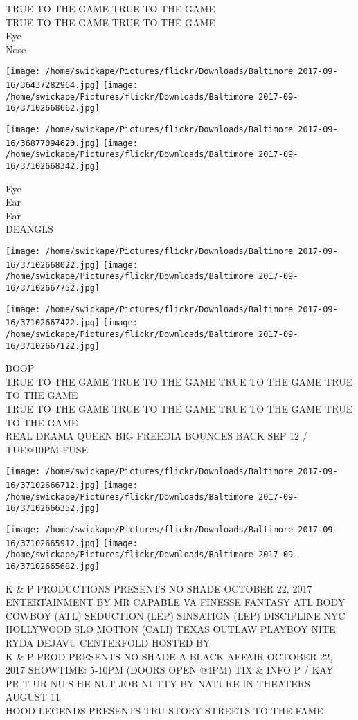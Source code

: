\documentclass[10pt,letterpaper]{article}
\begin{document}
TRUE TO THE GAME TRUE TO THE GAME\\
TRUE TO THE GAME TRUE TO THE GAME\\
Eye\\
Nose
\pagebreak

\texttt{[image: /home/swickape/Pictures/flickr/Downloads/Baltimore 2017-09-16/36437282964.jpg]}
\texttt{[image: /home/swickape/Pictures/flickr/Downloads/Baltimore 2017-09-16/37102668662.jpg]}

\texttt{[image: /home/swickape/Pictures/flickr/Downloads/Baltimore 2017-09-16/36877094620.jpg]}
\texttt{[image: /home/swickape/Pictures/flickr/Downloads/Baltimore 2017-09-16/37102668342.jpg]}

Eye\\
Ear\\
Ear\\
DEANGLS
\pagebreak

\texttt{[image: /home/swickape/Pictures/flickr/Downloads/Baltimore 2017-09-16/37102668022.jpg]}
\texttt{[image: /home/swickape/Pictures/flickr/Downloads/Baltimore 2017-09-16/37102667752.jpg]}

\texttt{[image: /home/swickape/Pictures/flickr/Downloads/Baltimore 2017-09-16/37102667422.jpg]}
\texttt{[image: /home/swickape/Pictures/flickr/Downloads/Baltimore 2017-09-16/37102667122.jpg]}

BOOP\\
TRUE TO THE GAME TRUE TO THE GAME TRUE TO THE GAME TRUE TO THE GAME\\
TRUE TO THE GAME TRUE TO THE GAME TRUE TO THE GAME TRUE TO THE GAME\\
REAL DRAMA QUEEN BIG FREEDIA BOUNCES BACK SEP 12 / TUE@10PM FUSE
\pagebreak

\texttt{[image: /home/swickape/Pictures/flickr/Downloads/Baltimore 2017-09-16/37102666712.jpg]}
\texttt{[image: /home/swickape/Pictures/flickr/Downloads/Baltimore 2017-09-16/37102666352.jpg]}

\texttt{[image: /home/swickape/Pictures/flickr/Downloads/Baltimore 2017-09-16/37102665912.jpg]}
\texttt{[image: /home/swickape/Pictures/flickr/Downloads/Baltimore 2017-09-16/37102665682.jpg]}

K \& P PRODUCTIONS PRESENTS NO SHADE OCTOBER 22, 2017 ENTERTAINMENT BY MR CAPABLE VA FINESSE FANTASY ATL BODY COWBOY (ATL) SEDUCTION (LEP) SINSATION (LEP) DISCIPLINE NYC HOLLYWOOD SLO MOTION (CALI) TEXAS OUTLAW PLAYBOY NITE RYDA DEJAVU CENTERFOLD HOSTED BY\\
K \& P PROD PRESENTS NO SHADE A BLACK AFFAIR OCTOBER 22, 2017 SHOWTIME: 5{-}10PM (DOORS OPEN @4PM) TIX \& INFO P / KAY\\
PR T UR NU S HE NUT JOB NUTTY BY NATURE IN THEATERS AUGUST 11\\
HOOD LEGENDS PRESENTS TRU STORY STREETS TO THE FAME
\pagebreak
\end{document}
